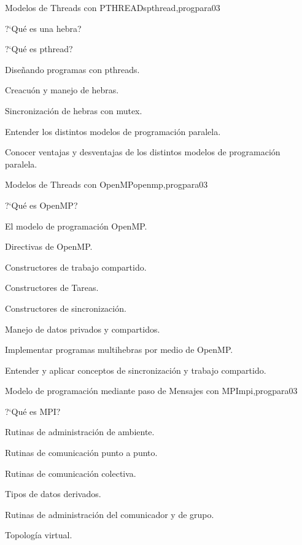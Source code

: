 \begin{syllabus}
\begin{unit}{Modelos de Threads con PTHREADs}{pthread,progpara}{0}{3}
\begin{topics}
         \item ?`Qué es una hebra?
         \item ?`Qué es  pthread?
         \item Diseñando programas con pthreads.
         \item Creacuón y manejo de hebras.
         \item Sincronización de hebras con mutex.
\end{topics}

\begin{unitgoals}
	\item Entender los distintos modelos de programación paralela.
	\item Conocer ventajas y desventajas de los distintos modelos de programación paralela.
\end{unitgoals}
\end{unit}

\begin{unit}{Modelos de Threads con OpenMP}{openmp,progpara}{0}{3}
\begin{topics}
         \item ?`Qué es OpenMP?
         \item El modelo de programación OpenMP.
         \item Directivas de OpenMP.
         \item Constructores de trabajo compartido.
         \item Constructores de Tareas.
         \item Constructores de sincronización.
	 \item Manejo de datos privados y compartidos.
\end{topics}

\begin{unitgoals}
	\item Implementar programas multihebras por medio de OpenMP.
	\item Entender y aplicar conceptos de sincronización y trabajo compartido.
\end{unitgoals}
\end{unit}

\begin{unit}{Modelo de programación mediante paso de Mensajes con MPI}{mpi,progpara}{0}{3}
\begin{topics}
         \item ?`Qué es MPI?
         \item Rutinas de administración de ambiente.
         \item Rutinas de comunicación punto a punto.
         \item Rutinas de comunicación colectiva.
         \item Tipos de datos derivados.
         \item Rutinas de administración del comunicador y de grupo.
	 \item Topología virtual.
\end{topics}


\end{unit}
\end{syllabus}
